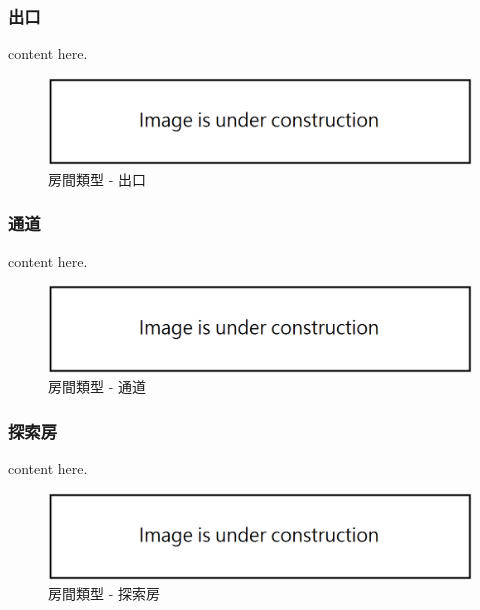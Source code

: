 \subsubsection{出口}
\label{sssec:method-spacepieces-types-reward}

content here.

\begin{figure}[ht]
  \begin{center}
    \includegraphics[width=1.0\textwidth]{figures/under_construction.png}
    \caption{房間類型 - 出口}
    \label{fig:roomtype-reward}
  \end{center}
\end{figure}

\subsubsection{通道}
\label{sssec:method-spacepieces-types-path}

content here.

\begin{figure}[ht]
  \begin{center}
    \includegraphics[width=1.0\textwidth]{figures/under_construction.png}
    \caption{房間類型 - 通道}
    \label{fig:roomtype-path}
  \end{center}
\end{figure}

\subsubsection{探索房}
\label{sssec:method-spacepieces-types-exploration}

content here.

\begin{figure}[ht]
  \begin{center}
    \includegraphics[width=1.0\textwidth]{figures/under_construction.png}
    \caption{房間類型 - 探索房}
    \label{fig:roomtype-exploration}
  \end{center}
\end{figure}

